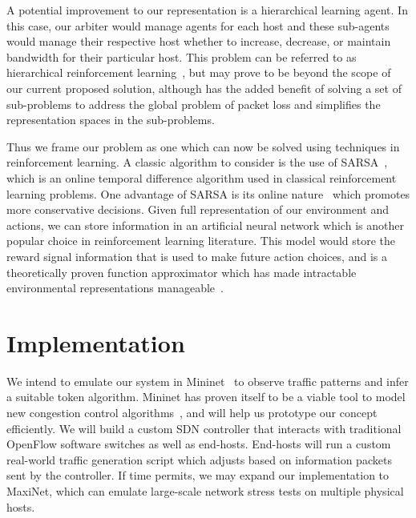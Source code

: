 \documentclass[sigconf]{acmart}
\begin{document}
A potential improvement to our representation is a hierarchical learning agent. In this case, our arbiter would manage agents for each host and these sub-agents would manage their respective host whether to increase, decrease, or maintain bandwidth for their particular host. This problem can be referred to as hierarchical reinforcement learning~\cite{Borga1993}, but may prove to be beyond the scope of our current proposed solution, although has the added benefit of solving a set of sub-problems to address the global problem of packet loss and simplifies the representation spaces in the sub-problems.

Thus we frame our problem as one which can now be solved using techniques in reinforcement learning. A classic algorithm to consider is the use of SARSA~\cite{Sutton:1998:IRL:551283}, which is an online temporal difference algorithm used in classical reinforcement learning problems. One advantage of SARSA is its online nature~\cite{Sutton:1998:IRL:551283} which promotes more conservative decisions. Given full representation of our environment and actions, we can store information in an artificial neural network which is another popular choice in reinforcement learning literature. This model would store the reward signal information that is used to make future action choices, and is a theoretically proven function approximator which has made intractable environmental representations manageable~\cite{Sutton:1998:IRL:551283}.






\section{Implementation}
\label{sec:implementation}
We intend to emulate our system in Mininet~\cite{mininet} to observe traffic patterns and infer a suitable token algorithm. Mininet has proven itself to be a viable tool to model new congestion control algorithms~\cite{mininet_learning}, and will help us prototype our concept efficiently. We will build a custom SDN controller that interacts with traditional OpenFlow software switches as well as end-hosts. End-hosts will run a custom real-world traffic generation script which adjusts based on information packets sent by the controller.
If time permits, we may expand our implementation to MaxiNet, which can emulate large-scale network stress tests on multiple physical hosts.
\end{document}
